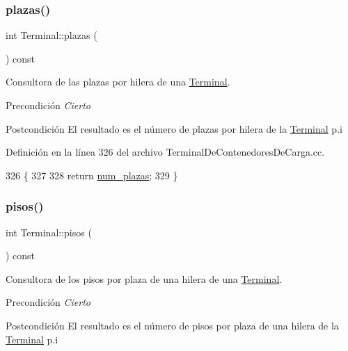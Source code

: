 \subsubsection{\texorpdfstring{plazas()}{plazas()}}
{\footnotesize\ttfamily int Terminal\+::plazas (\begin{DoxyParamCaption}{ }\end{DoxyParamCaption}) const}



Consultora de las plazas por hilera de una \hyperlink{class_terminal}{Terminal}. 

\begin{DoxyPrecond}{Precondición}
{\itshape Cierto} 
\end{DoxyPrecond}
\begin{DoxyPostcond}{Postcondición}
El resultado es el número de plazas por hilera de la \hyperlink{class_terminal}{Terminal} p.\+i 
\end{DoxyPostcond}


Definición en la línea 326 del archivo Terminal\+De\+Contenedores\+De\+Carga.\+cc.


\begin{DoxyCode}
326                            \{
327     
328     \textcolor{keywordflow}{return} \hyperlink{class_terminal_a14265a71722ee28f3a50cee4a72e5607}{num\_plazas};
329 \}
\end{DoxyCode}
\mbox{\label{class_terminal_ae6e79d13bb240d038142256552ae0ec9}} 
\subsubsection{\texorpdfstring{pisos()}{pisos()}}
{\footnotesize\ttfamily int Terminal\+::pisos (\begin{DoxyParamCaption}{ }\end{DoxyParamCaption}) const}



Consultora de los pisos por plaza de una hilera de una \hyperlink{class_terminal}{Terminal}. 

\begin{DoxyPrecond}{Precondición}
{\itshape Cierto} 
\end{DoxyPrecond}
\begin{DoxyPostcond}{Postcondición}
El resultado es el número de pisos por plaza de una hilera de la \hyperlink{class_terminal}{Terminal} p.\+i 
\end{DoxyPostcond}


